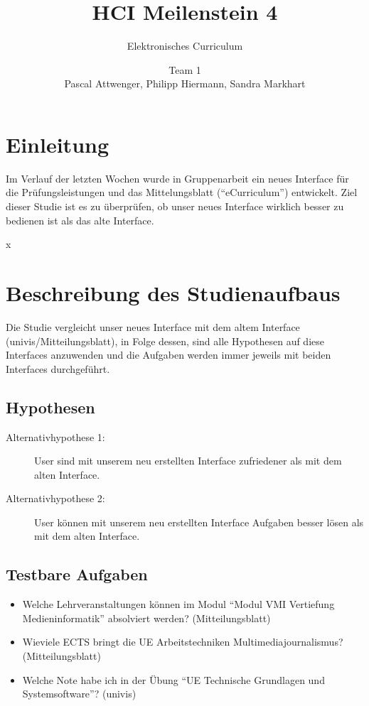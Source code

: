\documentclass[a4paper,10pt]{scrartcl}
\title{HCI Meilenstein 4}
\subtitle{Elektronisches Curriculum}
\author{Team 1 \\Pascal Attwenger, Philipp Hiermann, Sandra Markhart}
\begin{document}
\maketitle

\section{Einleitung}

Im Verlauf der letzten Wochen wurde in Gruppenarbeit ein neues Interface für die Prüfungsleistungen und das Mittelungsblatt (``eCurriculum'') entwickelt.
Ziel dieser Studie ist es zu überprüfen, ob unser neues Interface wirklich besser zu bedienen ist als das alte Interface.

x

\section{Beschreibung des Studienaufbaus} 

Die Studie vergleicht unser neues Interface mit dem altem Interface (univis/Mitteilungsblatt), in Folge dessen, sind alle Hypothesen auf diese
Interfaces anzuwenden und die Aufgaben werden immer jeweils mit beiden Interfaces durchgeführt.

\subsection{Hypothesen}

\begin{description}
 \item[Alternativhypothese 1: ] User sind mit unserem neu erstellten Interface zufriedener als mit dem alten Interface. 
\end{description}

\begin{description}
 \item[Alternativhypothese 2: ] User können mit unserem neu erstellten Interface Aufgaben besser lösen als mit dem alten Interface. 
\end{description}

\subsection{Testbare Aufgaben}

\begin{itemize}
 \item Welche Lehrveranstaltungen können im Modul ``Modul VMI Vertiefung Medieninformatik'' absolviert werden? (Mitteilungsblatt)
 \item Wieviele ECTS bringt die UE Arbeitstechniken Multimediajournalismus? (Mitteilungsblatt)
 \item Welche Note habe ich in der Übung ``UE Technische Grundlagen und Systemsoftware''? (univis)
\end{itemize}
\end{document}
